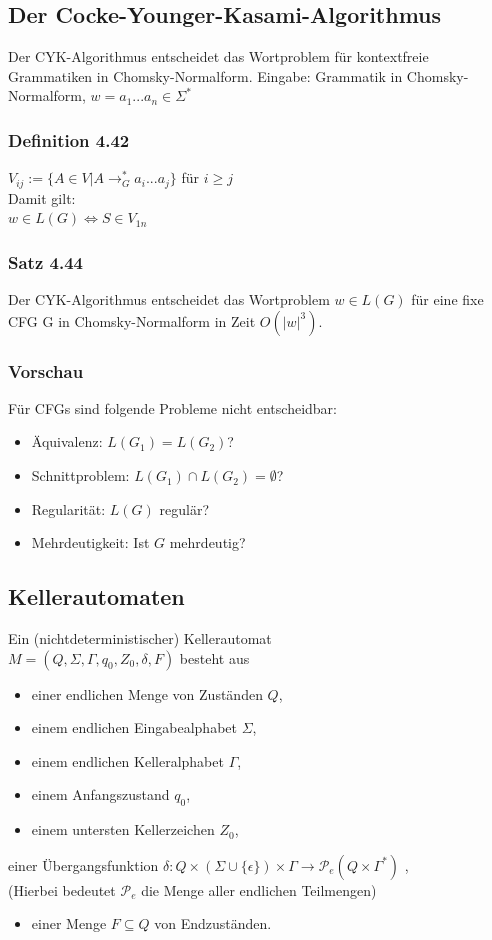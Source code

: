\documentclass[11pt]{article}
\begin{document}
\subsection{Der Cocke-Younger-Kasami-Algorithmus}
\label{sec:org1aec889}
Der CYK-Algorithmus entscheidet das Wortproblem für kontextfreie Grammatiken in Chomsky-Normalform.
Eingabe: Grammatik in Chomsky-Normalform,
\(w = a_1 ... a_n \in \Sigma^*\)
\subsubsection{Definition 4.42}
\label{sec:org565b92c}
\(V_{ij} := \{A \in V | A \rightarrow^*_G a_i...a_j\}\) für \(i \geq j\) \\
Damit gilt: \\
\(w \in L(G) \iff S \in V_{1n}\)
\subsubsection{Satz 4.44}
\label{sec:org445a455}
Der CYK-Algorithmus entscheidet das Wortproblem \(w \in L(G)\) für eine fixe CFG G in Chomsky-Normalform in Zeit \(O(|w|^3)\).

\subsubsection{Vorschau}
\label{sec:org48e3088}
Für CFGs sind folgende Probleme nicht entscheidbar:
\begin{itemize}
\item Äquivalenz: \(L(G_1) = L(G_2)\)?
\item Schnittproblem: \(L(G_1) \cap L(G_2) = \emptyset\)?
\item Regularität: \(L(G)\) regulär?
\item Mehrdeutigkeit: Ist \(G\) mehrdeutig?
\end{itemize}

\subsection{Kellerautomaten}
\label{sec:org6344033}
Ein (nichtdeterministischer) Kellerautomat \\
\(M = (Q, \Sigma, \Gamma, q_0, Z_0, \delta, F)\) besteht aus \\
\begin{itemize}
\item einer endlichen Menge von Zuständen \(Q\),
\item einem endlichen Eingabealphabet \(\Sigma\),
\item einem endlichen Kelleralphabet \(\Gamma\),
\item einem Anfangszustand \(q_0\),
\item einem untersten Kellerzeichen \(Z_0\),
\end{itemize}
einer Übergangsfunktion \(\delta: Q \times (\Sigma \cup \{\epsilon\}) \times \Gamma \rightarrow \mathcal{P}_e(Q \times \Gamma^*)\) , \\
(Hierbei bedeutet \(\mathcal{P}_e\) die Menge aller endlichen Teilmengen)
\begin{itemize}
\item einer Menge \(F \subseteq Q\) von Endzuständen.
\end{itemize}
\end{document}
